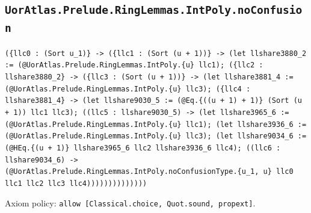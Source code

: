 \documentclass[11pt]{article}
\begin{document}
\subsection*{\texttt{UorAtlas.Prelude.RingLemmas.IntPoly.noConfusion}}
\noindent\texttt{(\{llc0 : (Sort u\_1)\} -> (\{llc1 : (Sort (u + 1))\} -> (let llshare3880\_2 := (@UorAtlas.Prelude.RingLemmas.IntPoly.\{u\} llc1); (\{llc2 : llshare3880\_2\} -> (\{llc3 : (Sort (u + 1))\} -> (let llshare3881\_4 := (@UorAtlas.Prelude.RingLemmas.IntPoly.\{u\} llc3); (\{llc4 : llshare3881\_4\} -> (let llshare9030\_5 := (@Eq.\{((u + 1) + 1)\} (Sort (u + 1)) llc1 llc3); ((llc5 : llshare9030\_5) -> (let llshare3965\_6 := (@UorAtlas.Prelude.RingLemmas.IntPoly.\{u\} llc1); (let llshare3936\_6 := (@UorAtlas.Prelude.RingLemmas.IntPoly.\{u\} llc3); (let llshare9034\_6 := (@HEq.\{(u + 1)\} llshare3965\_6 llc2 llshare3936\_6 llc4); ((llc6 : llshare9034\_6) -> (@UorAtlas.Prelude.RingLemmas.IntPoly.noConfusionType.\{u\_1, u\} llc0 llc1 llc2 llc3 llc4))))))))))))))}\par
\noindent Axiom policy: \texttt{allow [Classical.choice, Quot.sound, propext]}.\par
\end{document}
